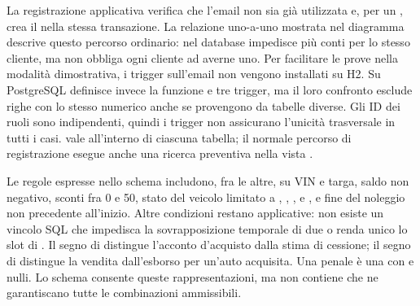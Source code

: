 La registrazione applicativa verifica che l'email non sia già utilizzata e, per un , crea il  nella stessa transazione. La relazione uno-a-uno mostrata nel diagramma descrive questo percorso ordinario: nel database  impedisce più conti per lo stesso cliente, ma non obbliga ogni cliente ad averne uno. Per facilitare le prove nella modalità dimostrativa, i trigger sull'email non vengono installati su H2. Su PostgreSQL  definisce invece la funzione  e tre trigger, ma il loro confronto esclude righe con lo stesso  numerico anche se provengono da tabelle diverse. Gli ID dei ruoli sono indipendenti, quindi i trigger non assicurano l'unicità trasversale in tutti i casi.  vale all'interno di ciascuna tabella; il normale percorso di registrazione esegue anche una ricerca preventiva nella vista .

Le regole espresse nello schema includono, fra le altre,  su VIN e targa, saldo non negativo, sconti fra 0 e 50, stato del veicolo limitato a , , ,  e , e fine del noleggio non precedente all'inizio. Altre condizioni restano applicative: non esiste un vincolo SQL che impedisca la sovrapposizione temporale di due  o renda unico lo slot di . Il segno di  distingue l'acconto d'acquisto dalla stima di cessione; il segno di  distingue la vendita dall'esborso per un'auto acquisita. Una penale è una  con  e  nulli. Lo schema consente queste rappresentazioni, ma non contiene  che ne garantiscano tutte le combinazioni ammissibili.
